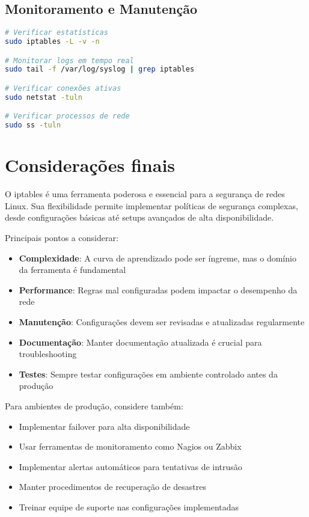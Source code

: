 \documentclass[12pt,fleqn]{article}
\begin{document}
\subsection{Monitoramento e Manutenção}

\begin{lstlisting}[language=bash, caption=Comandos de monitoramento]
# Verificar estatísticas
sudo iptables -L -v -n

# Monitorar logs em tempo real
sudo tail -f /var/log/syslog | grep iptables

# Verificar conexões ativas
sudo netstat -tuln

# Verificar processos de rede
sudo ss -tuln
\end{lstlisting}

\section{Considerações finais}

O iptables é uma ferramenta poderosa e essencial para a segurança de redes Linux. Sua flexibilidade permite implementar políticas de segurança complexas, desde configurações básicas até setups avançados de alta disponibilidade.

Principais pontos a considerar:

\begin{itemize}
    \item \textbf{Complexidade}: A curva de aprendizado pode ser íngreme, mas o domínio da ferramenta é fundamental
    \item \textbf{Performance}: Regras mal configuradas podem impactar o desempenho da rede
    \item \textbf{Manutenção}: Configurações devem ser revisadas e atualizadas regularmente
    \item \textbf{Documentação}: Manter documentação atualizada é crucial para troubleshooting
    \item \textbf{Testes}: Sempre testar configurações em ambiente controlado antes da produção
\end{itemize}

Para ambientes de produção, considere também:

\begin{itemize}
    \item Implementar failover para alta disponibilidade
    \item Usar ferramentas de monitoramento como Nagios ou Zabbix
    \item Implementar alertas automáticos para tentativas de intrusão
    \item Manter procedimentos de recuperação de desastres
    \item Treinar equipe de suporte nas configurações implementadas
\end{itemize}



\end{document}
